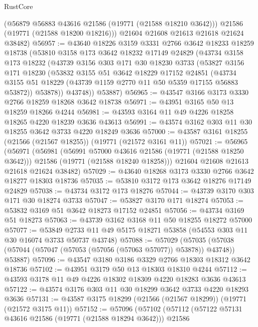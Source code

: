 \begin{lexlean}{RustCore}
\begin{coremodule}
        (@56879 @56883 @43616 @21586 (@19771 (@21588 @18210 @3642)))
        @21586
        (@19771 (@21588 @18200 @18216)))
      @21604
      @21608
      @21613
      @21618
      @21624
      @38482)
@56957 := @43640
    @18226
    @3159
    @3331
    @2766
    @3642
    @18233
    @18259
    @18738
    (@53810
      @3158
      @173
      @3642
      @18232
      @17149
      @24829
      (@43734
        @3158
        @173
        @18232
        (@43739
          @3156
          @303
          @171
          @30
          @18230
          @3733
          (@53827
            @3156
            @171
            @18230
            (@53832
              @3155
              @51
              @3642
              @18229
              @17152
              @24851
              (@43734 @3155 @51 @18229 (@43739 @1159 @2770 @11 @50 @5359 @17155 @56883 @53872))
              @53878))
          @43748))
      @53887)
@56965 := @43547 @3166 @3173 @3330 @2766 @18259 @18268 @3642 @18738
@56971 := @43951 @3165 @50 @13 @18259 @18266 @4244
@56981 := @43593 @3164 @11 @49 @4226 @18258 @18265 @4220 @18239 @3636 @43613
@56991 := @43574 @3162 @303 @11 @30 @18255 @3642 @3733 @4220 @18249 @3636
@57000 := @43587 @3161 @18255 (@21566 (@21567 @18255)) (@19771 (@21572 @3161 @11))
@57021 := @56965
    (@56971
      (@56981
        (@56991 @57000 @43616 @21586 (@19771 (@21588 @18250 @3642)))
        @21586
        (@19771 (@21588 @18240 @18258)))
      @21604
      @21608
      @21613
      @21618
      @21624
      @38482)
@57029 := @43640 @18268 @3173 @3330 @2766 @3642 @18277 @18303 @18736
@57035 := @53810 @3172 @173 @3642 @18276 @17149 @24829
@57038 := @43734 @3172 @173 @18276
@57044 := @43739 @3170 @303 @171 @30 @18274 @3733
@57047 := @53827 @3170 @171 @18274
@57053 := @53832 @3169 @51 @3642 @18273 @17152 @24851
@57056 := @43734 @3169 @51 @18273
@57063 := @43739 @3162 @3168 @11 @50 @18255 @18272 @57000
@57077 := @53849 @2733 @11 @49 @5175 @18271 @53858 (@54553 @303 @11 @30 @16074 @3733 @50737 @43748)
@57088 := @57029
    (@57035 (@57038 (@57044 (@57047 (@57053 (@57056 (@57063 @57077)) @53878)) @43748)) @53887)
@57096 := @43547 @3180 @3186 @3329 @2766 @18303 @18312 @3642 @18736
@57102 := @43951 @3179 @50 @13 @18303 @18310 @4244
@57112 := @43593 @3178 @11 @49 @4226 @18302 @18309 @4220 @18283 @3636 @43613
@57122 := @43574 @3176 @303 @11 @30 @18299 @3642 @3733 @4220 @18293 @3636
@57131 := @43587 @3175 @18299 (@21566 (@21567 @18299)) (@19771 (@21572 @3175 @11))
@57152 := @57096
    (@57102
      (@57112
        (@57122 @57131 @43616 @21586 (@19771 (@21588 @18294 @3642)))
        @21586

\end{coremodule}
\end{lexlean}
